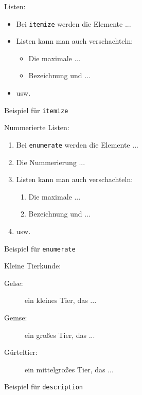 \begin{figure}[!htbp]
\begin{LTXexample}
Listen:
\begin{itemize}
 
\item Bei \texttt{itemize}
werden die Elemente ...
 
\item Listen kann man auch
verschachteln:
  \begin{itemize}
  \item Die maximale ...
  \item Bezeichnung und ...
  \end{itemize}
 
\item usw.
 
\end{itemize}
\end{LTXexample}
\caption{Beispiel für \texttt{itemize}} \label{item}
\end{figure}


\begin{figure}[!htbp]
\begin{LTXexample}
Nummerierte Listen:
\begin{enumerate}
 
\item Bei \texttt{enumerate}
werden die Elemente ...
 
\item Die Nummerierung ...
 
\item Listen kann man auch
verschachteln:
  \begin{enumerate}
  \item Die maximale ...
  \item Bezeichnung und ...
  \end{enumerate}
 
\item usw.
 
\end{enumerate}
\end{LTXexample}
\caption{Beispiel für \texttt{enumerate}} \label{enum}
\end{figure}
 
\begin{figure}[!htbp]  %
\begin{LTXexample}
Kleine Tierkunde:
\begin{description}
\item[Gelse:]
   ein kleines Tier, das ...
\item[Gemse:]
   ein gro\ss es Tier, das ...
\item[Gürteltier:]
   ein mittelgro\ss es Tier, das ...
\end{description}
\end{LTXexample}
\caption{Beispiel für \texttt{description}} \label{desc}
\end{figure}

